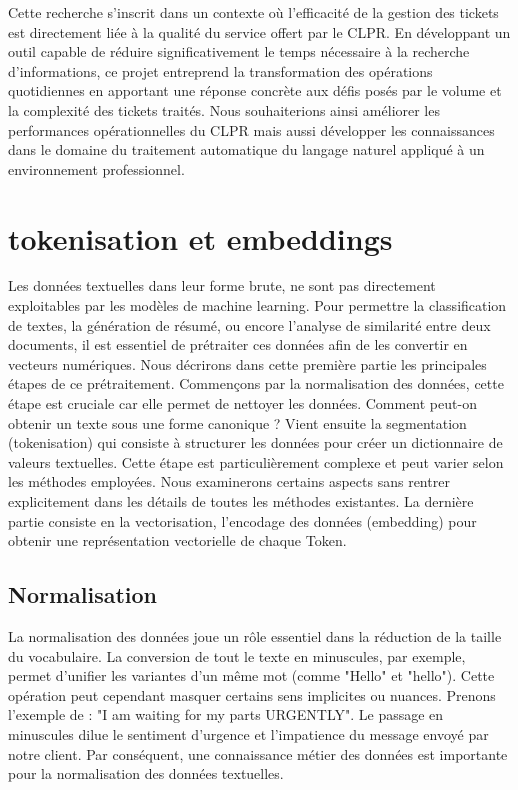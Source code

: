 \documentclass[12pt]{article}
\theoremstyle{definition}
\begin{document}
	Cette recherche s'inscrit dans un contexte où l'efficacité de la gestion des tickets est directement liée à la qualité du service offert par le CLPR. En développant un outil capable de réduire significativement le temps nécessaire à la recherche d'informations, ce projet entreprend la transformation des opérations quotidiennes en apportant une réponse concrète aux défis posés par le volume et la complexité des tickets traités. Nous souhaiterions ainsi améliorer les performances opérationnelles du CLPR mais aussi développer les connaissances dans le domaine du traitement automatique du langage naturel appliqué à un environnement professionnel.	

	
	\section{tokenisation et embeddings}
	Les données textuelles dans leur forme brute, ne sont pas directement exploitables par les modèles de machine learning. Pour permettre la classification de textes, la génération de résumé, ou encore l'analyse de similarité entre deux documents, il est essentiel de prétraiter ces données afin de les convertir en vecteurs numériques. Nous décrirons dans cette première partie les principales étapes de ce prétraitement. Commençons par la normalisation des données, cette étape est cruciale car elle permet de nettoyer les données. Comment peut-on obtenir un texte sous une forme canonique ? Vient ensuite la segmentation (tokenisation) qui consiste à structurer les données pour créer un dictionnaire de valeurs textuelles. Cette étape est particulièrement complexe et peut varier selon les méthodes employées. Nous examinerons certains aspects sans rentrer explicitement dans les détails de toutes les méthodes existantes. La dernière partie consiste en la vectorisation, l'encodage des données (embedding) pour obtenir une représentation vectorielle de chaque Token. %
	\subsection{Normalisation}
	La normalisation des données joue un rôle essentiel dans la réduction de la taille du vocabulaire. La conversion de tout le texte en minuscules, par exemple, permet d'unifier les variantes d'un même mot (comme "Hello" et "hello"). Cette opération peut cependant masquer certains sens implicites ou nuances. Prenons l'exemple de : "I am waiting for my parts URGENTLY". Le passage en minuscules dilue le sentiment d'urgence et l'impatience du message envoyé par notre client. Par conséquent, une connaissance métier des données est importante pour la normalisation des données textuelles.  
	
\end{document}
